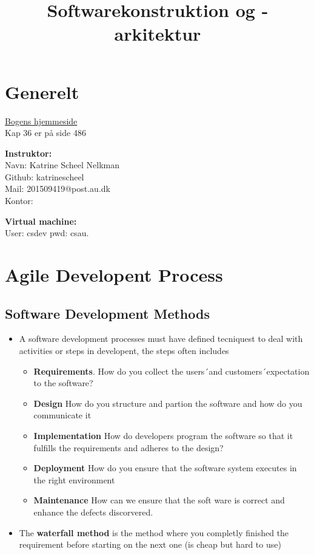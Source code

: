 \documentclass[11pt]{article}
\title{Softwarekonstruktion og -arkitektur}
\providecommand{\tightlist}{%
      \setlength{\itemsep}{0pt}\setlength{\parskip}{0pt}}
\begin{document}
    
    
    \maketitle
    
    

    
    \hypertarget{generelt}{%
\section{Generelt}\label{generelt}}

\href{http://www.baerbak.com}{Bogens hjemmeside}\\
Kap 36 er på side 486

\textbf{Instruktor:}\\
Navn: Katrine Scheel Nelkman\\
Github: katrinescheel\\
Mail: 201509419@post.au.dk\\
Kontor:

\textbf{Virtual machine:}\\
User: csdev pwd: csau.

    \hypertarget{agile-developent-process}{%
\section{Agile Developent Process}\label{agile-developent-process}}

\hypertarget{software-development-methods}{%
\subsection{Software Development
Methods}\label{software-development-methods}}

\begin{itemize}
\tightlist
\item
  A software development processes must have defined tecniquest to deal
  with activities or steps in developent, the steps often includes

  \begin{itemize}
  \tightlist
  \item
    \textbf{Requirements}. How do you collect the users´and
    customers´expectation to the software?
  \item
    \textbf{Design} How do you structure and partion the software and
    how do you communicate it
  \item
    \textbf{Implementation} How do developers program the software so
    that it fulfills the requirements and adheres to the design?
  \item
    \textbf{Deployment} How do you ensure that the software system
    executes in the right environment
  \item
    \textbf{Maintenance} How can we ensure that the soft ware is correct
    and enhance the defects discorvered.
  \end{itemize}
\item
  The \textbf{waterfall method} is the method where you completly
  finished the requirement before starting on the next one (is cheap but
  hard to use)
\end{itemize}
\end{document}
